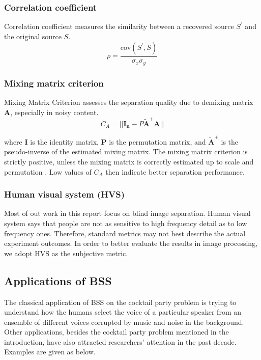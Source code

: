 \subsubsection{Correlation coefficient}
Correlation coefficient measures the similarity between a recovered source $S^{'}$ and the original source $S$.
\begin{equation}
    \rho = \frac{\text{cov}(S^{'},S)}{\sigma_x \sigma_y}
\end{equation}

\subsubsection{Mixing matrix criterion}
Mixing Matrix Criterion assesses the separation quality due to demixing matrix $\mathbf{A}$, especially in noisy content.
\begin{equation}
    C_A = ||\mathbf{I_n} - P\tilde{\mathbf{A}}^{+}\mathbf{A} ||
\end{equation}

where $\mathbf{I}$ is the identity matrix, $\mathbf{P}$ is the permutation matrix, and $\tilde{\mathbf{A}}^{+}$ is the pseudo-inverse of the estimated mixing matrix. The mixing matrix criterion is strictly positive, unless the mixing matrix is correctly estimated up to scale and permutation \cite{VAbolghasemi2012}. Low values of $C_A$ then indicate better separation performance.
 
\subsubsection{Human visual system (HVS)}
Most of out work in this report focus on blind image separation. Human visual system says that people are not as sensitive to high frequency detail as to low frequency ones. Therefore, standard metrics may not best describe the actual experiment outcomes. In order to better evaluate the results in image processing, we adopt HVS as the subjective metric.

\subsection{Applications of BSS}
The classical application of BSS on the cocktail party problem is trying to understand how the humans select the voice of a particular speaker from an ensemble of different voices corrupted by music and noise in the background. Other applications, besides the cocktail party problem mentioned in the introduction, have also attracted researchers' attention in the past decade. Examples are given as below. \\

